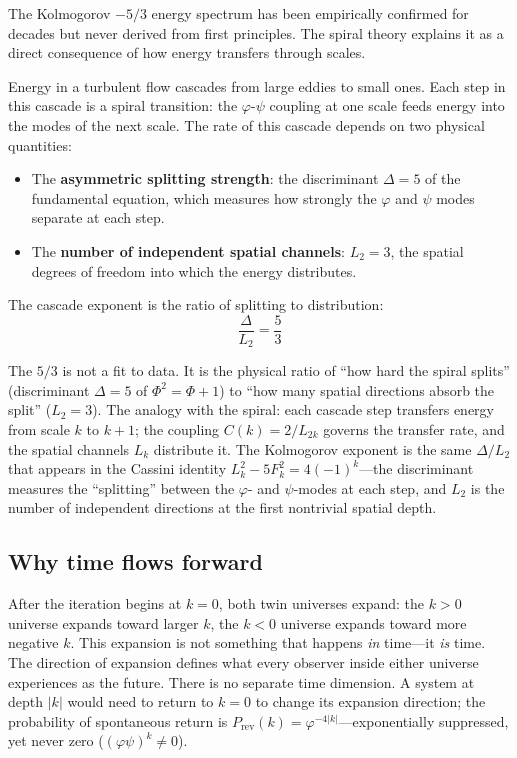 \documentclass[12pt,a4paper]{article}
\begin{document}
The Kolmogorov $-5/3$ energy spectrum has been empirically confirmed for decades but never derived from first principles. The spiral theory explains it as a direct consequence of how energy transfers through scales.

Energy in a turbulent flow cascades from large eddies to small ones. Each step in this cascade is a spiral transition: the $\varphi$-$\psi$ coupling at one scale feeds energy into the modes of the next scale. The rate of this cascade depends on two physical quantities:

\begin{itemize}
\item The \textbf{asymmetric splitting strength}: the discriminant $\Delta = 5$ of the fundamental equation, which measures how strongly the $\varphi$ and $\psi$ modes separate at each step.
\item The \textbf{number of independent spatial channels}: $L_2 = 3$, the spatial degrees of freedom into which the energy distributes.
\end{itemize}

The cascade exponent is the ratio of splitting to distribution:
\begin{equation}
\boxed{\frac{\Delta}{L_2} = \frac{5}{3}}
\end{equation}

The $5/3$ is not a fit to data. It is the physical ratio of ``how hard the spiral splits'' (discriminant $\Delta = 5$ of $\Phi^2 = \Phi + 1$) to ``how many spatial directions absorb the split'' ($L_2 = 3$). The analogy with the spiral: each cascade step transfers energy from scale $k$ to $k+1$; the coupling $C(k) = 2/L_{2k}$ governs the transfer rate, and the spatial channels $L_k$ distribute it. The Kolmogorov exponent is the same $\Delta/L_2$ that appears in the Cassini identity $L_k^2 - 5F_k^2 = 4(-1)^k$---the discriminant measures the ``splitting'' between the $\varphi$- and $\psi$-modes at each step, and $L_2$ is the number of independent directions at the first nontrivial spatial depth.



\subsection{Why time flows forward}

After the iteration begins at $k = 0$, both twin universes expand: the $k > 0$ universe expands toward larger $k$, the $k < 0$ universe expands toward more negative $k$. This expansion is not something that happens \emph{in} time---it \emph{is} time. The direction of expansion defines what every observer inside either universe experiences as the future. There is no separate time dimension. A system at depth $|k|$ would need to return to $k = 0$ to change its expansion direction; the probability of spontaneous return is $P_{\text{rev}}(k) = \varphi^{-4|k|}$---exponentially suppressed, yet never zero ($(\varphi\psi)^k \neq 0$).
\end{document}
